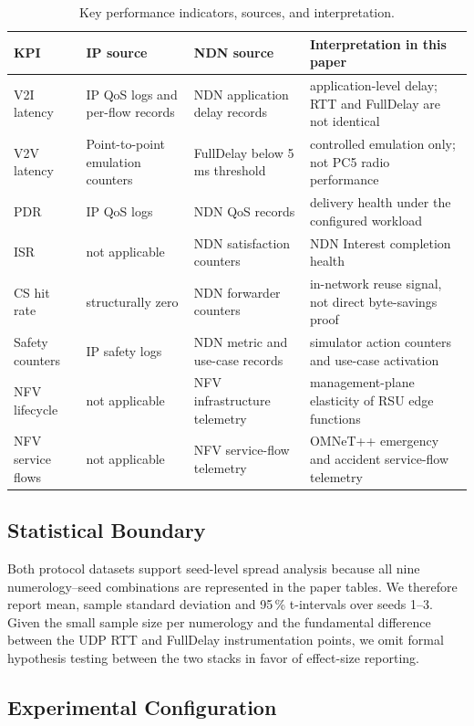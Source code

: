 \documentclass[journal]{IEEEtran}
\begin{document}
\begin{table}[!t]\centering
\caption{Key performance indicators, sources, and interpretation.}
\label{tab:kpis}
\footnotesize
\begin{tabular}{@{}p{}p{}p{}p{}@{}}
\toprule
KPI & IP source & NDN source & Interpretation in this paper\\
\midrule
V2I latency & IP QoS logs and per-flow records & NDN application delay records & application-level delay; RTT and FullDelay are not identical\\
V2V latency & Point-to-point emulation counters & FullDelay below 5 ms threshold & controlled emulation only; not PC5 radio performance\\
PDR & IP QoS logs & NDN QoS records & delivery health under the configured workload\\
ISR & not applicable & NDN satisfaction counters & NDN Interest completion health\\
CS hit rate & structurally zero & NDN forwarder counters & in-network reuse signal, not direct byte-savings proof\\
Safety counters & IP safety logs & NDN metric and use-case records & simulator action counters and use-case activation\\
NFV lifecycle & not applicable & NFV infrastructure telemetry & management-plane elasticity of RSU edge functions\\
NFV service flows & not applicable & NFV service-flow telemetry & OMNeT++ emergency and accident service-flow telemetry\\
\bottomrule
\end{tabular}
\end{table}

\subsection{Statistical Boundary}

Both protocol datasets support seed-level spread analysis because all nine numerology--seed combinations are represented in the paper tables. We therefore report mean, sample standard deviation and 95\,\% t-intervals over seeds 1--3. Given the small sample size per numerology and the fundamental difference between the UDP RTT and FullDelay instrumentation points, we omit formal hypothesis testing between the two stacks in favor of effect-size reporting.

\subsection{Experimental Configuration}
\end{document}
